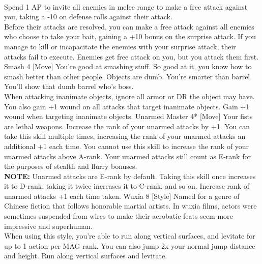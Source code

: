 \begin{path}
{\\Spend 1 AP to invite all enemies in melee range to make a free attack against you, taking a -10 on defense rolls against their attack.
\\Before their attacks are resolved, you can make a free attack against all enemies who choose to take your bait, gaining a +10 bonus on the surprise attack. If you manage to kill or incapacitate the enemies with your surprise attack, their attacks fail to execute.}
{Enemies get free attack on you, but you attack them first.}
\skilldescription
{Smash}
{4}
[Move]
{You're good at smashing stuff. So good at it, you know how to smash better than other people. Objects are dumb. You're smarter than barrel. You'll show that dumb barrel who's boss.
\\When attacking inanimate objects, ignore all armor or DR the object may have. You also gain +1 wound on all attacks that target inanimate objects.}
{Gain +1 wound when targeting inanimate objects.}
\skilldescription
{Unarmed Master}
{4*}
[Move]
{Your fists are lethal weapons. Increase the rank of your unarmed attacks by +1. You can take this skill multiple times, increasing the rank of your unarmed attacks an additional +1 each time. You cannot use this skill to increase the rank of your unarmed attacks above A-rank. Your unarmed attacks still count as E-rank for the purposes of stealth and flurry bonuses.
\\\textbf{NOTE:} Unarmed attacks are E-rank by default. Taking this skill once increases it to D-rank, taking it twice increases it to C-rank, and so on.}
{Increase rank of unarmed attacks +1 each time taken.}
\skilldescription
{Wuxia}
{8}
[Style]
{Named for a genre of Chinese fiction that follows honorable martial artists. In wuxia films, actors were sometimes suspended from wires to make their acrobatic feats seem more impressive and superhuman.
\\When using this style, you're able to run along vertical surfaces, and levitate for up to 1 action per MAG rank. You can also jump 2x your normal jump distance and height.}
{Run along vertical surfaces and levitate.}

\end{path}
